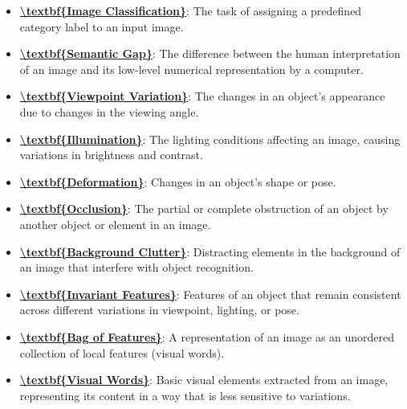 \documentclass{article}%
\begin{document}
\begin{itemize}[leftmargin=*]%
\item \href{https://www.math.purdue.edu/~yipn/351/07L2-Vision.pdf#page=2}{\textbf{\textbackslash{}textbf\{Image Classification\}}}: The task of assigning a predefined category label to an input image.%
\item \href{https://www.math.purdue.edu/~yipn/351/07L2-Vision.pdf#page=4}{\textbf{\textbackslash{}textbf\{Semantic Gap\}}}: The difference between the human interpretation of an image and its low-level numerical representation by a computer.%
\item \href{https://www.math.purdue.edu/~yipn/351/07L2-Vision.pdf#page=6}{\textbf{\textbackslash{}textbf\{Viewpoint Variation\}}}: The changes in an object's appearance due to changes in the viewing angle.%
\item \href{https://www.math.purdue.edu/~yipn/351/07L2-Vision.pdf#page=7}{\textbf{\textbackslash{}textbf\{Illumination\}}}: The lighting conditions affecting an image, causing variations in brightness and contrast.%
\item \href{https://www.math.purdue.edu/~yipn/351/07L2-Vision.pdf#page=8}{\textbf{\textbackslash{}textbf\{Deformation\}}}: Changes in an object's shape or pose.%
\item \href{https://www.math.purdue.edu/~yipn/351/07L2-Vision.pdf#page=9}{\textbf{\textbackslash{}textbf\{Occlusion\}}}: The partial or complete obstruction of an object by another object or element in an image.%
\item \href{https://www.math.purdue.edu/~yipn/351/07L2-Vision.pdf#page=10}{\textbf{\textbackslash{}textbf\{Background Clutter\}}}: Distracting elements in the background of an image that interfere with object recognition.%
\item \href{https://www.math.purdue.edu/~yipn/351/07L2-Vision.pdf#page=11}{\textbf{\textbackslash{}textbf\{Invariant Features\}}}: Features of an object that remain consistent across different variations in viewpoint, lighting, or pose.%
\item \href{https://www.math.purdue.edu/~yipn/351/07L2-Vision.pdf#page=12}{\textbf{\textbackslash{}textbf\{Bag of Features\}}}: A representation of an image as an unordered collection of local features (visual words).%
\item \href{https://www.math.purdue.edu/~yipn/351/07L2-Vision.pdf#page=14}{\textbf{\textbackslash{}textbf\{Visual Words\}}}: Basic visual elements extracted from an image, representing its content in a way that is less sensitive to variations.%

\end{itemize}
\end{document}
